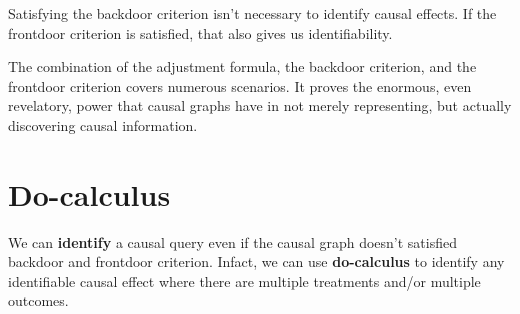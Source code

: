 Satisfying the backdoor criterion isn't necessary to identify causal effects. If the
frontdoor criterion is satisfied, that also gives us identifiability.

The combination of the adjustment formula, the backdoor criterion, and the frontdoor
criterion covers numerous scenarios. It proves the enormous, even revelatory, power
that causal graphs have in not merely representing, but actually discovering causal
information.
\section{Do-calculus}

We can \textbf{identify} a causal query even if the causal graph doesn't satisfied backdoor and frontdoor criterion.
Infact, we can use \textbf{do-calculus} to identify any identifiable causal effect where there are multiple
treatments and/or multiple outcomes.

